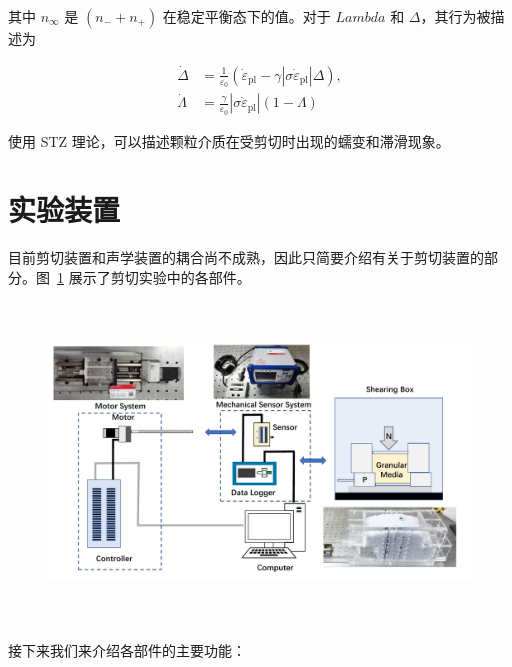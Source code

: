 其中 $n_{\infty}$ 是 $(n_{-} + n_{+})$ 在稳定平衡态下的值。对于 $Lambda$ 和 $\Delta$，其行为被描述为

\begin{align}
  \dot{\Delta} &= \frac{1}{\varepsilon_{0}}\left(\dot{\varepsilon}_{\text{pl}} - \gamma|\sigma\dot{\varepsilon}_{\text{pl}}|\Delta\right),\\
  \dot{\Lambda} &= \frac{\gamma}{\varepsilon_{0}}\left|\sigma\dot{\varepsilon}_{\text{pl}}\right|(1-\Lambda)
\end{align}

使用 STZ 理论，可以描述颗粒介质在受剪切时出现的蠕变和滞滑现象。

\section{实验装置}

目前剪切装置和声学装置的耦合尚不成熟，因此只简要介绍有关于剪切装置的部分。图~\ref{fig:apparatus_2} 展示了剪切实验中的各部件。

\begin{figure}[!htp]
    \centering
    \includegraphics[height=8.5cm]{figures/4_apparatus.pdf}
    \label{fig:apparatus_2}
  \end{figure}

接下来我们来介绍各部件的主要功能：


